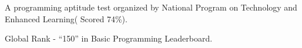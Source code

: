 \documentclass[10pt,a4paper]{altacv}
\begin{document}
\newline
{A programming aptitude test organized by National Program on Technology and Enhanced Learning( Scored 74\%).}

\newline
{ Global Rank - “150” in Basic Programming Leaderboard.}
















\clearpage

\end{document}

